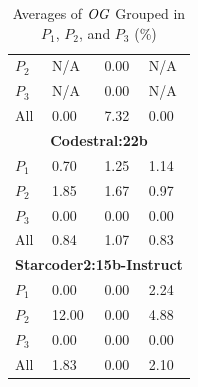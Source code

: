 \begin{table}
\begin{tabularx}{\textwidth}{l X X X}
$P_2$ 
& N/A 
& 0.00
& N/A\\
$P_3$ 
& N/A
& 0.00
& N/A\\
All 
& 0.00 
& 7.32
& 0.00\\
\midrule
\multicolumn{4}{c}{\small\textbf{Codestral:22b}} \\
\midrule
$P_1$ 
& 0.70
& 1.25
& 1.14\\
$P_2$ 
& 1.85
& 1.67
& 0.97\\
$P_3$ 
& 0.00 
& 0.00
& 0.00\\
All 
& 0.84 
& 1.07
& 0.83\\
\midrule
\multicolumn{4}{c}{\small\textbf{Starcoder2:15b-Instruct}} \\
\midrule
$P_1$ 
& 0.00 
& 0.00 
& 2.24\\
$P_2$ 
& 12.00 
& 0.00 
& 4.88\\
$P_3$ 
& 0.00 
& 0.00 
& 0.00\\
All 
& 1.83
& 0.00 
& 2.10\\
\bottomrule
\end{tabularx}
\caption{Averages of $\mathit{OG}$ Grouped in $P_1$, $P_2$, and $P_3$ (\%)}
\label{tab:fgi_og}
\end{table}

